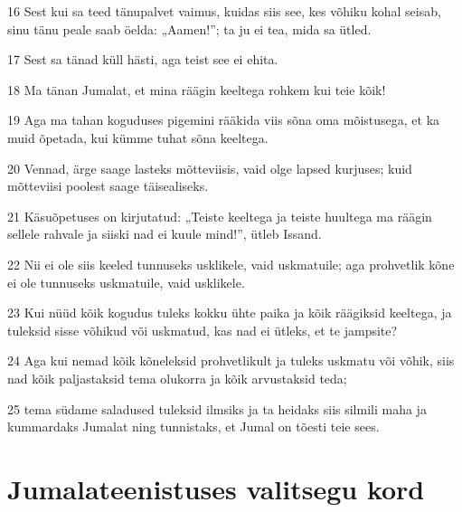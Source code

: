 \par 16 Sest kui sa teed tänupalvet vaimus, kuidas siis see, kes võhiku kohal seisab, sinu tänu peale saab öelda: „Aamen!”; ta ju ei tea, mida sa ütled.
\par 17 Sest sa tänad küll hästi, aga teist see ei ehita.
\par 18 Ma tänan Jumalat, et mina räägin keeltega rohkem kui teie kõik!
\par 19 Aga ma tahan koguduses pigemini rääkida viis sõna oma mõistusega, et ka muid õpetada, kui kümme tuhat sõna keeltega.
\par 20 Vennad, ärge saage lasteks mõtteviisis, vaid olge lapsed kurjuses; kuid mõtteviisi poolest saage täisealiseks.
\par 21 Käsuõpetuses on kirjutatud: „Teiste keeltega ja teiste huultega ma räägin sellele rahvale ja siiski nad ei kuule mind!”, ütleb Issand.
\par 22 Nii ei ole siis keeled tunnuseks usklikele, vaid uskmatuile; aga prohvetlik kõne ei ole tunnuseks uskmatuile, vaid usklikele.
\par 23 Kui nüüd kõik kogudus tuleks kokku ühte paika ja kõik räägiksid keeltega, ja tuleksid sisse võhikud või uskmatud, kas nad ei ütleks, et te jampsite?
\par 24 Aga kui nemad kõik kõneleksid prohvetlikult ja tuleks uskmatu või võhik, siis nad kõik paljastaksid tema olukorra ja kõik arvustaksid teda;
\par 25 tema südame saladused tuleksid ilmsiks ja ta heidaks siis silmili maha ja kummardaks Jumalat ning tunnistaks, et Jumal on tõesti teie sees.

\section*{Jumalateenistuses valitsegu kord}

